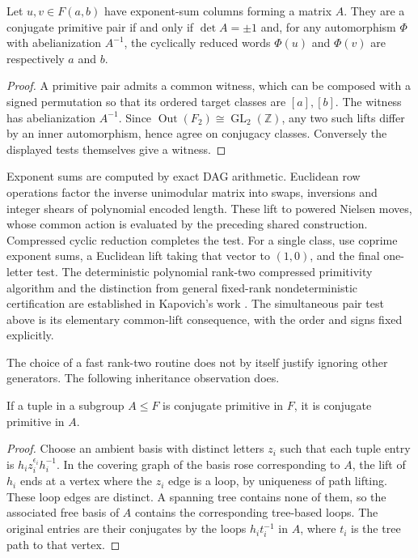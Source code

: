 \begin{proposition}
Let $u,v\in F(a,b)$ have exponent-sum columns forming a matrix $A$.
They are a conjugate primitive pair if and only if $\det A=\pm1$ and,
for any automorphism $\Phi$ with abelianization $A^{-1}$, the cyclically
reduced words $\Phi(u)$ and $\Phi(v)$ are respectively $a$ and $b$.
\end{proposition}
\begin{proof}
A primitive pair admits a common witness, which can be composed with a
signed permutation so that its ordered target classes are $[a],[b]$.
The witness has abelianization $A^{-1}$.  Since
$\operatorname{Out}(F_2)\cong\operatorname{GL}_2(\mathbb Z)$, any two
such lifts differ by an inner automorphism, hence agree on conjugacy
classes.  Conversely the displayed tests themselves give a witness.
\end{proof}

Exponent sums are computed by exact DAG arithmetic.  Euclidean row
operations factor the inverse unimodular matrix into swaps, inversions
and integer shears of polynomial encoded length.  These lift to powered
Nielsen moves, whose common action is evaluated by the preceding shared
construction.  Compressed cyclic reduction completes the test.
For a single class, use coprime exponent sums, a Euclidean lift taking
that vector to $(1,0)$, and the final one-letter test.  The deterministic
polynomial rank-two compressed primitivity algorithm and the distinction
from general fixed-rank nondeterministic certification are established
in Kapovich's work \cite{signed-kapovich}.  The simultaneous pair test
above is its elementary common-lift consequence, with the order and
signs fixed explicitly.

The choice of a fast rank-two routine does not by itself justify ignoring
other generators.  The following inheritance observation does.

\begin{lemma}
If a tuple in a subgroup $A\leq F$ is conjugate primitive in $F$, it is
conjugate primitive in $A$.
\end{lemma}
\begin{proof}
Choose an ambient basis with distinct letters $z_i$ such that each tuple
entry is $h_i z_i^{\epsilon_i}h_i^{-1}$.  In the covering graph of the
basis rose corresponding to $A$, the lift of $h_i$ ends at a vertex
where the $z_i$ edge is a loop, by uniqueness of path lifting.  These
loop edges are distinct.  A spanning tree contains none of them, so the
associated free basis of $A$ contains the corresponding tree-based
loops.  The original entries are their conjugates by the loops
$h_i t_i^{-1}$ in $A$, where $t_i$ is the tree path to that vertex.
\end{proof}

